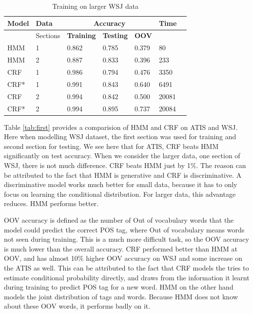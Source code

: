 \documentclass[twocolumn]{article}
\begin{document}
\begin{table}[h]    
\centering
\begin{tabular}{@{}lllllll@{}}
\toprule
\textbf{Model} & \textbf{Data} & \multicolumn{3}{c}{\textbf{Accuracy}}               & \textbf{Time} \\ \midrule
               &  Sections     & \textbf{Training} & \textbf{Testing} & \textbf{OOV} &               \\ \midrule
HMM            & 1                     & 0.862             & 0.785            & 0.379        & 80       \\ \midrule
HMM            & 2                     & 0.887             & 0.833            & 0.396        & 233       \\ \midrule
CRF            & 1                     & 0.986             & 0.794            & 0.476        & 3350       \\ \midrule
CRF*           & 1                     & 0.991             & 0.843          & 0.640        & 6491   \\ \midrule
CRF            & 2                     & 0.994             & 0.842            & 0.500        & 20081      \\ \midrule
CRF*           & 2                     & 0.994             & 0.895            & 0.737        & 20084     \\ \bottomrule
\end{tabular}
\caption{Training on larger WSJ data}
\label{largedata}
\end{table}
Table \ref{tab:first} provides a comparision of HMM and CRF on ATIS and WSJ. Here when modelling WSJ dataset, the first section was used for training and second section for testing. We see here that for ATIS, CRF beats HMM significantly on test accuracy. When we consider the larger data, one section of WSJ, there is not much difference. CRF beats HMM just by 1\%. The reason can be attributed to the fact that HMM is generative and CRF is discriminative. A discriminative model works much better for small data, because it has to only focus on learning the conditional distribution. For larger data, this advantage reduces. HMM performs better. 

OOV accuracy is defined as the number of Out of vocabulary words that the model could predict the correct POS tag, where Out of vocabulary means words not seen during training. This is a much more difficult task, so the OOV accuracy is much lower than the overall accuracy. CRF performed better than HMM at OOV, and has almost 10\% higher OOV accuracy on WSJ and some increase on the ATIS as well. This can be attributed to the fact that CRF models the tries to estimate conditional probability directly, and draws from the information it learnt during training to predict POS tag for a new word. HMM on the other hand models the joint distribution of tags and words. Because HMM does not know about these OOV words, it performs badly on it. 
\end{document}
